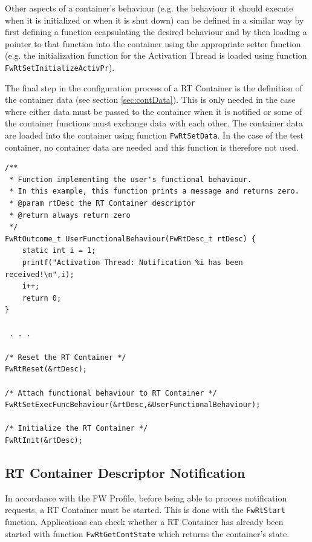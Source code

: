 \documentclass[a4paper,10pt]{article}
\begin{document}
Other aspects of a container's behaviour (e.g. the behaviour it should execute when it is initialized or when it is shut down) can be defined in a similar way by first defining a function ecapsulating the desired behaviour and by then loading a pointer to that function into the container using the appropriate setter function (e.g. the initialization function for the Activation Thread is loaded using function \texttt{FwRtSetInitializeActivPr}).

The final step in the configuration process of a RT Container is the definition of the container data (see section \ref{sec:contData}). This is only needed in the case where either data must be passed to the container when it is notified or some of the container functions must exchange data with each other. The container data are loaded into the container using function \texttt{FwRtSetData}. In the case of the test container, no container data are needed and this function is therefore not used.

\begin{lstlisting}
/**
 * Function implementing the user's functional behaviour.
 * In this example, this function prints a message and returns zero.
 * @param rtDesc the RT Container descriptor
 * @return always return zero
 */
FwRtOutcome_t UserFunctionalBehaviour(FwRtDesc_t rtDesc) {
	static int i = 1;
	printf("Activation Thread: Notification %i has been received!\n",i);
	i++;
	return 0;
}

 . . .

/* Reset the RT Container */
FwRtReset(&rtDesc);

/* Attach functional behaviour to RT Container */
FwRtSetExecFuncBehaviour(&rtDesc,&UserFunctionalBehaviour);

/* Initialize the RT Container */
FwRtInit(&rtDesc);
\end{lstlisting}

\subsection{RT Container Descriptor Notification}\label{sec:rtNotification}
In accordance with the FW Profile, before being able to process notification requests, a RT Container must be started. This is done with the \texttt{FwRtStart} function. Applications can check whether a RT Container has already been started with function \texttt{FwRtGetContState} which returns the container's state.
\end{document}
